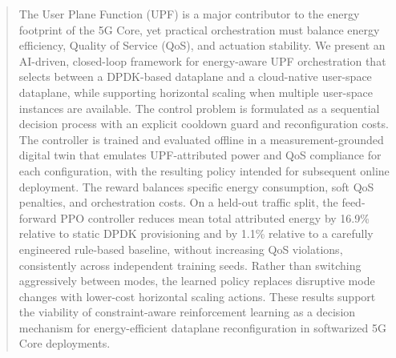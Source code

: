 \documentclass[a4paper,fleqn]{cas-sc}
\begin{document}
\begin{abstract}
The User Plane Function (UPF) is a major contributor to the energy footprint of the 5G Core, yet practical orchestration must balance energy efficiency, Quality of Service (QoS), and actuation stability. We present an AI-driven, closed-loop framework for energy-aware UPF orchestration that selects between a DPDK-based dataplane and a cloud-native user-space dataplane, while supporting horizontal scaling when multiple user-space instances are available. The control problem is formulated as a sequential decision process with an explicit cooldown guard and reconfiguration costs. The controller is trained and evaluated offline in a measurement-grounded digital twin that emulates UPF-attributed power and QoS compliance for each configuration, with the resulting policy intended for subsequent online deployment. The reward balances specific energy consumption, soft QoS penalties, and orchestration costs. On a held-out traffic split, the feed-forward PPO controller reduces mean total attributed energy by 16.9\% relative to static DPDK provisioning and by 1.1\% relative to a carefully engineered rule-based baseline, without increasing QoS violations, consistently across independent training seeds. Rather than switching aggressively between modes, the learned policy replaces disruptive mode changes with lower-cost horizontal scaling actions. These results support the viability of constraint-aware reinforcement learning as a decision mechanism for energy-efficient dataplane reconfiguration in softwarized 5G Core deployments.
\end{abstract}


\end{document}
